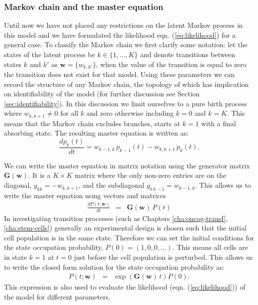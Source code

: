\subsubsection{Markov chain and the master equation}
\label{sec:markov-chain-master}

Until now we have not placed any restrictions on the latent Markov process in this model and we have formulated the
likelihood eqn. (\ref{eq:likelihood}) for a general case. To classify the Markov chain we first clarify some notation: let the states of the latent process be $k \in \lbrace 1, \ldots, K \rbrace$ and denote transitions between states $k$ and $k'$ as $\mathbf{w} = \lbrace w_{k,k'} \rbrace$, when the value of the transition is equal to zero the transition does not exist for that model. Using these parameters we can record the structure of any Markov chain, the topology of which has implication on identifiability of the model (for further discussion see Section \ref{sec:identifiability}). In this discussion we limit ourselves to a pure birth process where $w_{k,k+1} \ne 0$ for all $k$ and zero otherwise including $k=0$ and $k=K$. This means that the Markov chain excludes branches, starts at $k=1$ with a final absorbing state. The resulting master equation is written as:
\begin{equation}
  \label{eq:master}
  \frac{d p_k(t)}{dt} = w_{k-1,k}\, p_{k-1}(t) - w_{k,k+1}\, p_k(t).
\end{equation}

We can write the master equation in matrix notation using the generator matrix $\mathbf{G}(\mathbf{w})$. It is a $K \times K$ matrix where the only non-zero entries are on the diagonal, $g_{kk}=-w_{k,k+1}$, and the subdiagonal $ g_{k\,k-1}=w_{k-1,k}$. This allows us to write the master equation using vectors and matrices
\begin{eqnarray}
  \label{eq:masterMat}
 \frac{d  P(t; \mathbf{w})}{dt} &=& \mathbf{G}(\mathbf{w})\,P (t)
\end{eqnarray}
In investigating transition processes (such as Chapters \ref{cha:oncog-transf}, \ref{cha:stem-cells}) generally an experimental design is chosen such that the initial cell population is in the same state. Therefore we can set the initial conditions for the state occupation probability, $P(0) = (1, 0 , 0, \ldots)$. This means all cells are in state $k=1$ at $t=0$ just before the cell population is perturbed. This allows us to write the closed form solution for the state occupation probability as:
\begin{eqnarray}
  \label{eq:state-occ}
  P(t; \mathbf{w}) &= & \exp{\left(\mathbf{G}(\mathbf{w})\,t \right) } {P}(0).
\end{eqnarray}
This expression is also used to evaluate the likelihood (eqn. (\ref{eq:likelihood})) of the model for different parameters.

